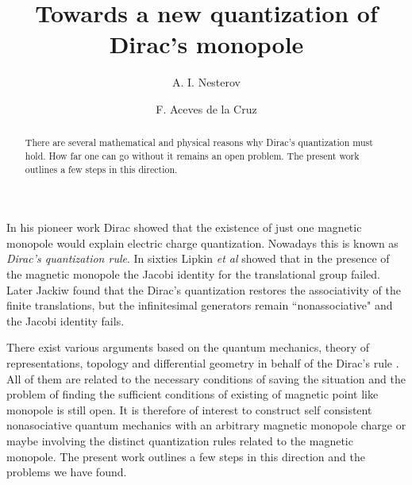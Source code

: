 \documentclass[a4paper,twocolumn,aps,showpacs,showkeys]{revtex4}
\begin{document}
\title{Towards a new quantization of Dirac's monopole}

\author{A. I. Nesterov}

\author{F. Aceves de la Cruz}


\begin{abstract}
There are several mathematical and physical reasons why Dirac's
quantization must hold. How far one can go without it remains an
open problem. The present work outlines a few steps in this
direction.
\end{abstract}




\maketitle

In his pioneer work \cite{Dir} Dirac showed that the existence of
just one magnetic monopole would explain electric charge
quantization. Nowadays this is known as {\it Dirac's quantization
rule}. In sixties Lipkin {\it et al} \cite{Lip} showed that in the
presence of the magnetic monopole the Jacobi identity for the
translational group failed. Later Jackiw \cite{Jac} found that the
Dirac's quantization restores the associativity of the finite
translations, but the infinitesimal generators remain
``nonassociative" and the Jacobi identity fails.

There exist various arguments based on the quantum mechanics,
theory of representations, topology and differential geometry in
behalf of the Dirac's rule \cite{Wu1,Wu2,Jac,GS,Nsh,K}. All of
them are related to the necessary conditions of saving the
situation and the problem of finding the sufficient conditions of
existing of magnetic point like monopole is still open. It is
therefore of interest to construct self consistent nonasociative
quantum mechanics with an arbitrary magnetic monopole charge or
maybe involving the distinct quantization rules related to the
magnetic monopole. The present work outlines a few steps in this
direction and the problems we have found.
\end{document}
